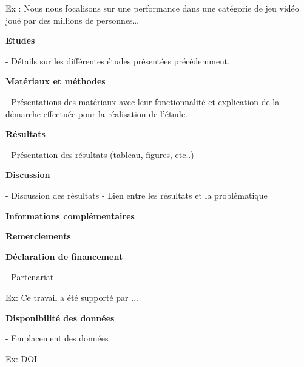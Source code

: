\documentclass[11pt,oneside]{article}
\begin{document}
\begin{flushleft}
Ex : Nous nous focalisons sur une performance dans une catégorie de jeu vidéo joué par des millions de personnes…
\end{flushleft}

\begin{flushleft}
\textbf{Etudes}
\end{flushleft}

-	Détails sur les différentes études présentées précédemment.

\begin{flushleft}
\textbf{Matériaux et méthodes}
\end{flushleft}

-	Présentations des matériaux avec leur fonctionnalité et explication de la démarche effectuée pour la réalisation de l’étude. 

\begin{flushleft}
\textbf{Résultats}
\end{flushleft}

-	Présentation des résultats (tableau, figures, etc..)

\begin{flushleft}
\textbf{Discussion}
\end{flushleft}

-	Discussion des résultats
-	Lien entre les résultats et la problématique


\begin{flushleft}
\textbf{Informations complémentaires}
\end{flushleft}

\begin{flushleft}
\textbf{Remerciements}
\end{flushleft}

\newpage

\begin{flushleft}
\textbf{Déclaration de financement}
\end{flushleft}

-	Partenariat

\begin{flushleft}
Ex: Ce travail a été supporté par ...
\end{flushleft}

\begin{flushleft}
\textbf{Disponibilité des données}
\end{flushleft}

-	Emplacement des données

\begin{flushleft}
Ex: DOI
\end{flushleft}
\end{document}
